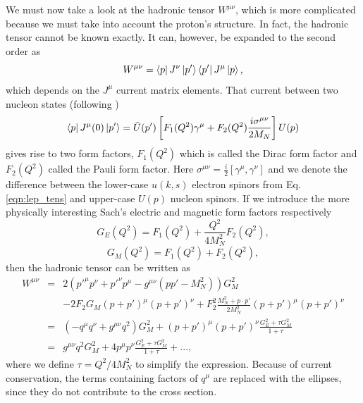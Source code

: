 We must now take a look at the hadronic tensor $W^{\mu\nu}$, which is more complicated because we must take into account the proton's structure. In fact, the hadronic tensor cannot be known exactly. It can, however, be expanded to the second order as
\begin{equation}
W^{\mu\nu} = \bra{p}J^{\nu}\ket{p'}\bra{p'}J^{\mu}\ket{p},
\end{equation}
which depends on the $J^{\mu}$ current matrix elements. That current between two nucleon states (following \cite{book:halzen})
\begin{equation}
\bra{p}J^{\mu}(0)\ket{p'} = \bar{U}(p')\left[ F_1(Q^2)\gamma^{\mu}+F_2(Q^2)\frac{i\sigma^{\mu\nu}}{2M_N} \right]U(p)
\end{equation}
gives rise to two form factors, $F_1(Q^2)$ which is called the Dirac form factor and $F_2(Q^2)$ called the Pauli form factor. Here $\sigma^{\mu\nu}=\tfrac{i}{2}[\gamma^{\mu},\gamma^{\nu}]$ and we denote the difference between the lower-case $u(k,s)$ electron spinors from Eq. \ref{eqn:lep_tens} and upper-case $U(p)$ nucleon spinors. If we introduce the more physically interesting Sach's electric and magnetic form factors respectively
\begin{equation}
\nonumber
G_E(Q^2) = F_1(Q^2) + \frac{Q^2}{4M_N^2} F_2(Q^2),
\end{equation}
\begin{equation}
\nonumber
G_M(Q^2) = F_1(Q^2) + F_2(Q^2),
\end{equation}
then the hadronic tensor can be written as
\begin{eqnarray}
\nonumber
W^{\mu\nu} &=& 2(p'^{\mu}p^{\nu} + p'^{\nu}p^{\mu} - g^{\mu\nu}(pp'-M_N^2))G_M^2 \\
\nonumber
&&- 2F_2G_M(p+p')^{\mu}(p+p')^{\nu}+F_2^2\frac{M_N^2+p \cdot p'}{2M_N^2}(p+p')^{\mu}(p+p')^{\nu} \\
\nonumber
&=& (-q^{\mu}q^{\nu}+g^{\mu\nu}q^2)G_M^2+(p+p')^{\mu}(p+p')^{\nu}\frac{G_E^2+\tau G_M^2}{1+\tau} \\
&=& g^{\mu\nu}q^2G_M^2+4p^{\mu}p^{\nu}\frac{G_E^2+\tau G_M^2}{1+\tau} + ...,
\end{eqnarray} 
where we define $\tau = Q^2/4M_N^2$ to simplify the expression. Because of current conservation, the terms containing factors of $q^{\mu}$ are replaced with the ellipses, since they do not contribute to the cross section.

